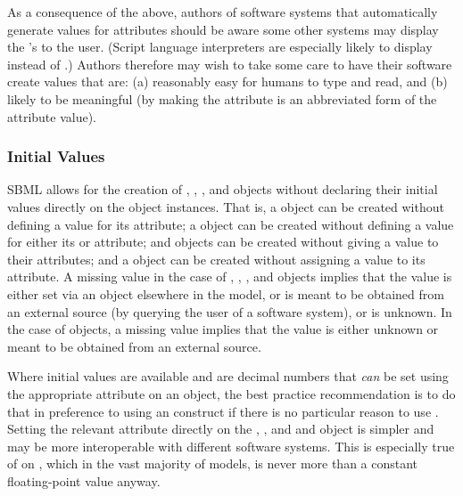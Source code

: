 As a consequence of the above, authors of software systems that
automatically generate values for  attributes should be
aware some other systems may display the 's to the user.
(Script language interpreters are especially likely to display
 instead of .)  Authors therefore may wish
to take some care to have their software create  values
that are: (a) reasonably easy for humans to type and read, and (b)
likely to be meaningful (\eg by making the  attribute is
an abbreviated form of the  attribute value).


\subsubsection{Initial Values}
\label{sec:bp:initialvalues}

SBML allows for the creation of \Compartment, \Species,
\Parameter, \LocalParameter and \SpeciesReference objects without
declaring their initial values directly on the object instances.
That is, a \Compartment object can be created without defining a
value for its  attribute; a \Species object can be
created without defining a value for either its
 or  attribute;
\Parameter and \LocalParameter objects can be created without
giving a value to their  attributes; and a
\SpeciesReference object can be created without assigning a value
to its  attribute.  A missing value in the
case of \Compartment, \Species, \Parameter, and \SpeciesReference
objects implies that the value is either set via an
\InitialAssignment object elsewhere in the model, or is meant to
be obtained from an external source (\eg by querying the user of a
software system), or is unknown.  In the case of \LocalParameter
objects, a missing value implies that the value is either unknown
or meant to be obtained from an external source.

Where initial values are available and are decimal numbers that
\emph{can} be set using the appropriate attribute on an object,
the best practice recommendation is to do that in preference to
using an \InitialAssignment construct if there is no particular
reason to use \InitialAssignment.  Setting the relevant attribute
directly on the \Compartment, \Species, and \Parameter and
\SpeciesReference object is simpler and may be more interoperable
with different software systems.  This is especially true of
 on \SpeciesReference, which in the vast
majority of models, is never more than a constant floating-point
value anyway.

